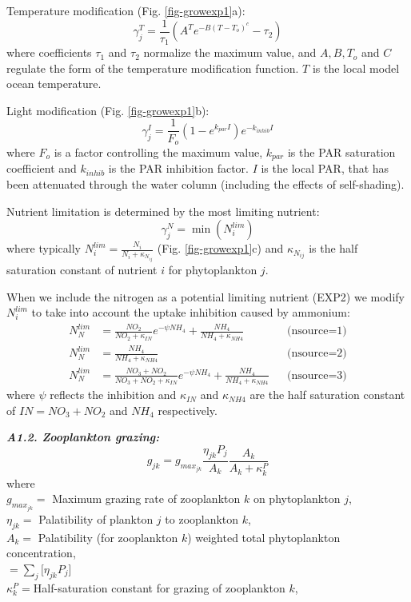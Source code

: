 \documentclass[11pt,letterpaper,english]{article}
\begin{document}
Temperature modification (Fig. \ref{fig-growexp1}a):\\
\[
\gamma_j^T= \frac{1}{\tau_1} (A^T e^{-B(T-T_o)^c} - \tau_2 )
\]
where coefficients $\tau_1$ and $\tau_2$ normalize the maximum
value, and $A,B,T_o$ and $C$ regulate the form of the temperature
modification function. $T$ is the local model ocean temperature.

Light modification (Fig. \ref{fig-growexp1}b):\\
\[
\gamma_j^I= \frac{1}{F_o} (1-e^{k_{par} I} ) e^{-k_{inhib} I}
\]
where $F_{o}$ is a factor controlling the maximum value, $k_{par}$ is the
PAR saturation coefficient and $k_{inhib}$ is the PAR inhibition factor.
$I$ is the local PAR, that has been attenuated through the water column
(including the effects of self-shading).

Nutrient limitation is determined by the most limiting nutrient:
\[
\gamma_j^N = \min(N_i^{lim})
\]
where typically
$N_i^{lim}=\frac{N_i}{N_i+\kappa_{N_{ij}}}$
(Fig. \ref{fig-growexp1}c) and $\kappa_{N_{ij}}$ is the half saturation constant of nutrient $i$ for phytoplankton $j$.

When we include the nitrogen as a potential limiting nutrient (EXP2) we 
modify $N_i^{lim}$ to take into account the uptake inhibition caused by ammonium:
\begin{align*}
N_N^{lim} &= \frac{NO_2}{NO_2+\kappa_{IN}} e^{-\psi NH_4}
+\frac{NH_4}{NH_4 + \kappa_{NH4}}  && \text{(nsource=1)} \\
N_N^{lim} &= \frac{NH_4}{NH_4 + \kappa_{NH4}}  && \text{(nsource=2)} \\
N_N^{lim} &= \frac{NO_3 + NO_2}{NO_3+NO_2+\kappa_{IN}} e^{-\psi NH_4}
+\frac{NH_4}{NH_4 + \kappa_{NH4}}  && \text{(nsource=3)}
\end{align*}
where $\psi$ reflects the inhibition and $\kappa_{IN}$ and $ \kappa_{NH4}$
are the half saturation constant of $IN=NO_3+NO_2$ and $NH_4$ respectively.

\vspace{.2cm}

{\it {\bf A1.2. Zooplankton grazing:}}\\
\[
 g_{jk} =g_{max_{jk}} \frac{\eta_{jk} P_j}{A_k} \frac{A_k}{A_k+\kappa^P_k}
\]
where\\
\mbox{} \hspace{.5cm} $g_{max_{jk}}=$ Maximum grazing rate of zooplankton $k$ on
phytoplankton $j$,\\
\mbox{} \hspace{.5cm} $\eta_{jk}=$ Palatibility of plankton $j$ to zooplankton $k$,\\
\mbox{} \hspace{.5cm} $A_k=$ Palatibility (for zooplankton $k$) weighted total phytoplankton concentration,\\
\mbox{} \hspace{1.1cm} $=\sum_j [\eta_{jk} P_j$] \\
\mbox{} \hspace{.5cm} $\kappa^P_k=$Half-saturation constant for grazing of zooplankton $k$,\\
\end{document}
